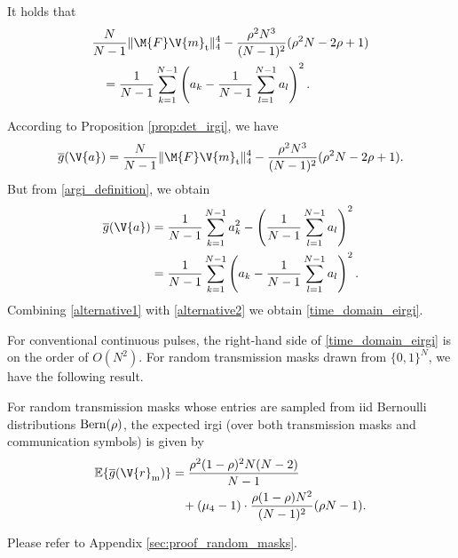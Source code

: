 \documentclass[journal,a4paper,10pt, romanappendices]{IEEEtran}
\begin{document}
\begin{lemma}\label{lem:eargi_alternative}
It holds that
\begin{align}\label{time_domain_eirgi}
&\frac{N}{N-1}\|\M{F}\V{m}_{\rm t}\|_4^4-\frac{\rho^2 N^3}{(N-1)^2}(\rho^2 N -2\rho +1)\nonumber \\
& \hspace{3mm}= \frac{1}{N-1}\sum_{k=1}^{N-1} \left(a_k-\frac{1}{N-1}\sum_{l=1}^{N-1}a_l\right)^2.
\end{align}
\begin{IEEEproof}
According to Proposition \ref{prop:det_irgi}, we have
\begin{equation}\label{alternative1}
\overline{g}(\V{a}) = \frac{N}{N-1}\|\M{F}\V{m}_{\rm t}\|_4^4-\frac{\rho^2 N^3}{(N-1)^2}(\rho^2 N -2\rho +1).
\end{equation}
But from \eqref{argi_definition}, we obtain
\begin{align}\label{alternative2}
\overline{g}(\V{a}) &=\frac{1}{N-1}\sum_{k=1}^{N-1} a_k^2 - \left(\frac{1}{N-1} \sum_{l=1}^{N-1} a_l\right)^2 \nonumber\\
&=\frac{1}{N-1}\sum_{k=1}^{N-1} \left(a_k-\frac{1}{N-1}\sum_{l=1}^{N-1}a_l\right)^2.
\end{align}
Combining \eqref{alternative1} with \eqref{alternative2} we obtain \eqref{time_domain_eirgi}.
\end{IEEEproof}
\end{lemma}

For conventional continuous pulses, the right-hand side of \eqref{time_domain_eirgi} is on the order of $O(N^2)$. For random transmission masks drawn from $\{0,1\}^N$, we have the following result.

\begin{proposition}\label{prop:random_masks}
For random transmission masks whose entries are sampled from \ac{iid} Bernoulli distributions ${\rm Bern}(\rho)$, the expected \ac{irgi} (over both transmission masks and communication symbols) is given by
\begin{align}\label{eirgi_data2}
\mathbb{E}\{\overline{g}(\V{r}_{\rm m})\}
&=\frac{\rho^2(1-\rho)^2 N(N-2)}{N-1} \nonumber \\
&\hspace{3mm}+(\mu_4-1)\cdot \frac{\rho(1-\rho) N^2}{(N-1)^2}(\rho N-1).
\end{align}
\begin{IEEEproof}
Please refer to Appendix \ref{sec:proof_random_masks}.
\end{IEEEproof}
\end{proposition}
\end{document}
